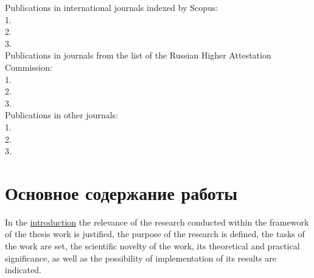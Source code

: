 Publications in international journals indexed by Scopus:\\
1.\\
2.\\
3.\\

Publications in journals from the list of the Russian Higher Attestation Commission:\\
1.\\
2.\\
3.\\

Publications in other journals:\\
1.\\
2.\\
3.

\section*{Основное содержание работы }
In the \underline{introduction} the relevance of the research conducted within the framework of the thesis work is justified, the purpose of the research is defined, the tasks of the work are set, the scientific novelty of the work, its theoretical and practical significance, as well as the possibility of implementation of its results are indicated. 
